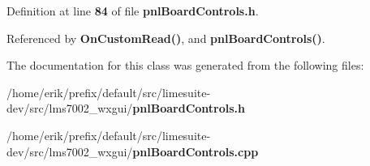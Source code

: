 Definition at line {\bf 84} of file {\bf pnl\+Board\+Controls.\+h}.



Referenced by {\bf On\+Custom\+Read()}, and {\bf pnl\+Board\+Controls()}.



The documentation for this class was generated from the following files\+:\begin{DoxyCompactItemize}
\item 
/home/erik/prefix/default/src/limesuite-\/dev/src/lms7002\+\_\+wxgui/{\bf pnl\+Board\+Controls.\+h}\item 
/home/erik/prefix/default/src/limesuite-\/dev/src/lms7002\+\_\+wxgui/{\bf pnl\+Board\+Controls.\+cpp}\end{DoxyCompactItemize}
